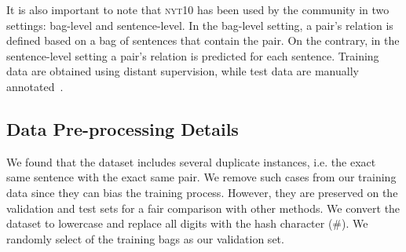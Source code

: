 \documentclass[11pt]{article}
\begin{document}
It is also important to note that \textsc{nyt10} has been used by the community in two settings: bag-level and sentence-level.
In the bag-level setting, a pair's relation is defined based on a bag of sentences that contain the pair. 
On the contrary, in the sentence-level setting a pair's relation is predicted for each sentence. Training data are obtained using distant supervision, while test data are manually annotated~\citep{hoffmann2011knowledge}. 



\subsection{Data Pre-processing Details}

We found that the dataset includes several duplicate instances, i.e. the exact same sentence with the exact same pair. We remove such cases from our training data since they can bias the training process. However, they are preserved on the validation and test sets for a fair comparison with other methods.
We convert the dataset to lowercase and replace all digits with the hash character (\#). We randomly select  of the training bags as our validation set. \\

\begin{table}[h!]
    \centering
    \caption{Statistics of the \textsc{nyt10} (520K version) dataset.}
    \label{tab:nyt_stats}
\end{table}
\end{document}

